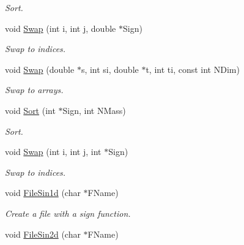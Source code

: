 \begin{DoxyCompactItemize}
\begin{DoxyCompactList}\small\item\em Sort. \end{DoxyCompactList}\item 
void \hyperlink{classMatematica_a73416c2f40f207ac8a0ee0c620094c8f}{Swap} (int i, int j, double $\ast$Sign)\hypertarget{classMatematica_a73416c2f40f207ac8a0ee0c620094c8f}{}\label{classMatematica_a73416c2f40f207ac8a0ee0c620094c8f}

\begin{DoxyCompactList}\small\item\em Swap to indices. \end{DoxyCompactList}\item 
void \hyperlink{classMatematica_a48768f457142f01ca2980874f5546578}{Swap} (double $\ast$s, int si, double $\ast$t, int ti, const int N\+Dim)\hypertarget{classMatematica_a48768f457142f01ca2980874f5546578}{}\label{classMatematica_a48768f457142f01ca2980874f5546578}

\begin{DoxyCompactList}\small\item\em Swap to arrays. \end{DoxyCompactList}\item 
void \hyperlink{classMatematica_aab3ee9e44dd1ed078ca31182b4cd6ed2}{Sort} (int $\ast$Sign, int N\+Mass)\hypertarget{classMatematica_aab3ee9e44dd1ed078ca31182b4cd6ed2}{}\label{classMatematica_aab3ee9e44dd1ed078ca31182b4cd6ed2}

\begin{DoxyCompactList}\small\item\em Sort. \end{DoxyCompactList}\item 
void \hyperlink{classMatematica_ae664740009706537716b87e623af73de}{Swap} (int i, int j, int $\ast$Sign)\hypertarget{classMatematica_ae664740009706537716b87e623af73de}{}\label{classMatematica_ae664740009706537716b87e623af73de}

\begin{DoxyCompactList}\small\item\em Swap to indices. \end{DoxyCompactList}\item 
void \hyperlink{classMatematica_a71ea784216a17ac3a6ac15a949cefe0c}{File\+Sin1d} (char $\ast$F\+Name)\hypertarget{classMatematica_a71ea784216a17ac3a6ac15a949cefe0c}{}\label{classMatematica_a71ea784216a17ac3a6ac15a949cefe0c}

\begin{DoxyCompactList}\small\item\em Create a file with a sign function. \end{DoxyCompactList}\item 
void \hyperlink{classMatematica_ab9ebc463654207b4cccb506e91b7f0ee}{File\+Sin2d} (char $\ast$F\+Name)\hypertarget{classMatematica_ab9ebc463654207b4cccb506e91b7f0ee}{}\label{classMatematica_ab9ebc463654207b4cccb506e91b7f0ee}


\end{DoxyCompactItemize}
